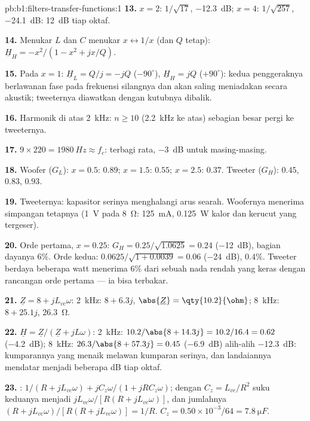 \begin{solution}{pb:b1:filters-transfer-functions:1}
\textbf{13.} $x = 2$: $1/\sqrt{17}$, \qty{-12.3}{dB}; $x = 4$: $1/\sqrt{257}$,
\qty{-24.1}{dB}: \qty{12}{dB} tiap oktaf.

\textbf{14.} Menukar $L$ dan $C$ menukar $x \leftrightarrow 1/x$ (dan
$Q$ tetap): $\underline H_H = -x^2/(1 - x^2 + jx/Q)$.

\textbf{15.} Pada $x = 1$: $\underline H_L = Q/j = -jQ$ ($-90^\circ$),
$\underline H_H = jQ$ ($+90^\circ$): kedua penggeraknya berlawanan fase
pada frekuensi silangnya dan akan saling meniadakan secara akustik;
tweeternya diawatkan dengan kutubnya dibalik.

\textbf{16.} Harmonik di atas \qty{2}{kHz}: $n \geq 10$ (\qty{2.2}{kHz}
ke atas) sebagian besar pergi ke tweeternya.

\textbf{17.} $9 \times 220 = \qty{1980}{Hz} \approx f_c$: terbagi rata,
\qty{-3}{dB} untuk masing-masing.

\textbf{18.} Woofer ($G_L$): $x = 0.5$: $0.89$; $x = 1.5$: $0.55$; $x = 2.5$:
$0.37$. Tweeter ($G_H$): $0.45$, $0.83$, $0.93$.

\textbf{19.} Tweeternya: kapasitor serinya menghalangi arus searah.
Woofernya menerima simpangan tetapnya (\qty{1}{V} pada \qty{8}{\ohm}:
\qty{125}{mA}, \qty{0.125}{W} kalor dan kerucut yang tergeser).

\textbf{20.} Orde pertama, $x = 0.25$: $G_H = 0.25/\sqrt{1.0625} = 0.24$
(\qty{-12}{dB}), bagian dayanya $6\%$. Orde kedua: $0.0625/\sqrt{1 +
0.0039} = 0.06$ (\qty{-24}{dB}), $0.4\%$. Tweeter berdaya beberapa watt
menerima $6\%$ dari sebuah nada rendah yang keras dengan rancangan orde
pertama --- ia bisa terbakar.

\textbf{21.} $\underline Z = 8 + jL_{vc}\omega$: \qty{2}{kHz}: $8 + 6.3j$,
$\abs{\underline Z} = \qty{10.2}{\ohm}$; \qty{8}{kHz}: $8 + 25.1j$,
\qty{26.3}{\ohm}.

\textbf{22.} $\underline H = \underline Z/(\underline Z + jL\omega)$:
\qty{2}{kHz}: $10.2/\abs{8 + 14.3j} = 10.2/16.4 = 0.62$ (\qty{-4.2}{dB});
\qty{8}{kHz}: $26.3/\abs{8 + 57.3j} = 0.45$ (\qty{-6.9}{dB}) alih-alih
\qty{-12.3}{dB}:  kumparannya yang menaik melawan kumparan
serinya, dan landaiannya mendatar menjadi beberapa dB tiap oktaf.

\textbf{23.} : $1/(R + jL_{vc}\omega) + jC_z\omega/(1 + jRC_z\omega)$;
dengan $C_z = L_{vc}/R^2$ suku keduanya menjadi $jL_{vc}\omega/[R(R +
jL_{vc}\omega)]$, dan jumlahnya $(R + jL_{vc}\omega)/[R(R + jL_{vc}\omega)]
= 1/R$. $C_z = 0.50\times10^{-3}/64 = \qty{7.8}{\micro F}$.


\end{solution}
